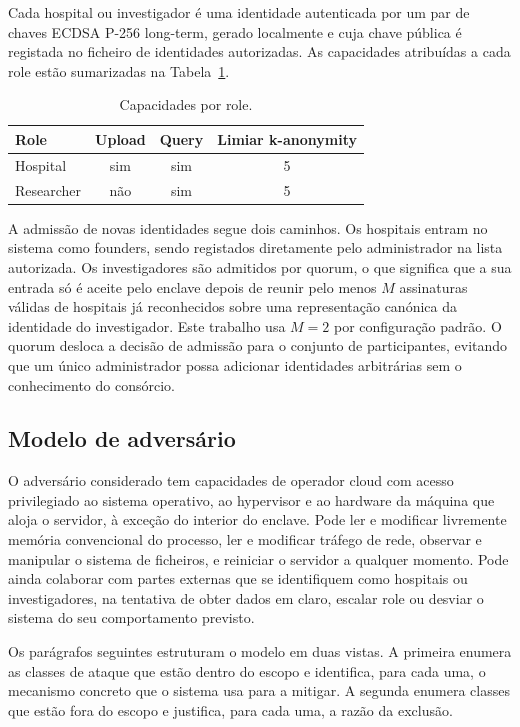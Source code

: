 Cada hospital ou investigador é uma identidade autenticada por um par de chaves ECDSA P-256 long-term, gerado localmente e cuja chave pública é registada no ficheiro de identidades autorizadas. As capacidades atribuídas a cada role estão sumarizadas na Tabela~\ref{tab:roles}.

\begin{table}[H]
\centering
\begin{tabular}{lccc}
\toprule
Role & Upload & Query & Limiar k-anonymity \\
\midrule
Hospital & sim & sim & 5 \\
Researcher & não & sim & 5 \\
\bottomrule
\end{tabular}
\caption{Capacidades por role.}
\label{tab:roles}
\end{table}

A admissão de novas identidades segue dois caminhos. Os hospitais entram no sistema como founders, sendo registados diretamente pelo administrador na lista autorizada. Os investigadores são admitidos por quorum, o que significa que a sua entrada só é aceite pelo enclave depois de reunir pelo menos $M$ assinaturas válidas de hospitais já reconhecidos sobre uma representação canónica da identidade do investigador. Este trabalho usa $M=2$ por configuração padrão. O quorum desloca a decisão de admissão para o conjunto de participantes, evitando que um único administrador possa adicionar identidades arbitrárias sem o conhecimento do consórcio.

\subsection{Modelo de adversário}

O adversário considerado tem capacidades de operador cloud com acesso privilegiado ao sistema operativo, ao hypervisor e ao hardware da máquina que aloja o servidor, à exceção do interior do enclave. Pode ler e modificar livremente memória convencional do processo, ler e modificar tráfego de rede, observar e manipular o sistema de ficheiros, e reiniciar o servidor a qualquer momento. Pode ainda colaborar com partes externas que se identifiquem como hospitais ou investigadores, na tentativa de obter dados em claro, escalar role ou desviar o sistema do seu comportamento previsto.

Os parágrafos seguintes estruturam o modelo em duas vistas. A primeira enumera as classes de ataque que estão dentro do escopo e identifica, para cada uma, o mecanismo concreto que o sistema usa para a mitigar. A segunda enumera classes que estão fora do escopo e justifica, para cada uma, a razão da exclusão.

